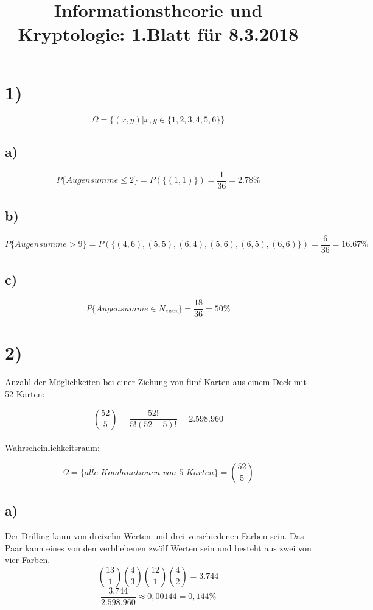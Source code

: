 \documentclass[11pt,a4paper]{article}
\begin{document}
  \title{Informationstheorie und Kryptologie: 1.Blatt für 8.3.2018}
  \maketitle

\section*{1)}
  \[ \Omega = \{(x,y) |x,y \in \{ 1,2,3,4,5,6 \} \} \]

  \subsection*{a)}
    \[ P \{ Augensumme \leq 2 \} = P(\{ (1,1)\} ) = \frac{1}{36} = 2.78 \% \]

  \subsection*{b)}
    \[ P \{ Augensumme > 9 \} = P(\{ (4,6), (5,5), (6,4), (5,6), (6,5), (6,6)\} ) = \frac{6}{36} = 16.67 \% \]

  \subsection*{c)}
    \[ P \{ Augensumme \in N_{even} \} = \frac{18}{36} = 50 \% \]

\section*{2)}
  Anzahl der Möglichkeiten bei einer Ziehung von fünf Karten aus einem Deck mit 52 Karten:

  \[ \binom{52}{5} = \frac{52!}{5!(52-5)!} = 2.598.960 \]
  \\
  Wahrscheinlichkeitsraum:

  \[ \Omega = \{ \textit{alle Kombinationen von 5 Karten} \} = \binom{52}{5} \]

  \subsection*{a)}
    Der Drilling kann von dreizehn Werten und drei verschiedenen Farben sein. Das Paar kann eines von den verbliebenen zwölf Werten sein und besteht aus zwei von vier Farben.
    \\
    \[ \binom{13}{1}\binom{4}{3}\binom{12}{1}\binom{4}{2} = 3.744 \]
    \[ \frac{3.744}{2.598.960} \approx 0,00144 = 0,144 \% \]
\end{document}

